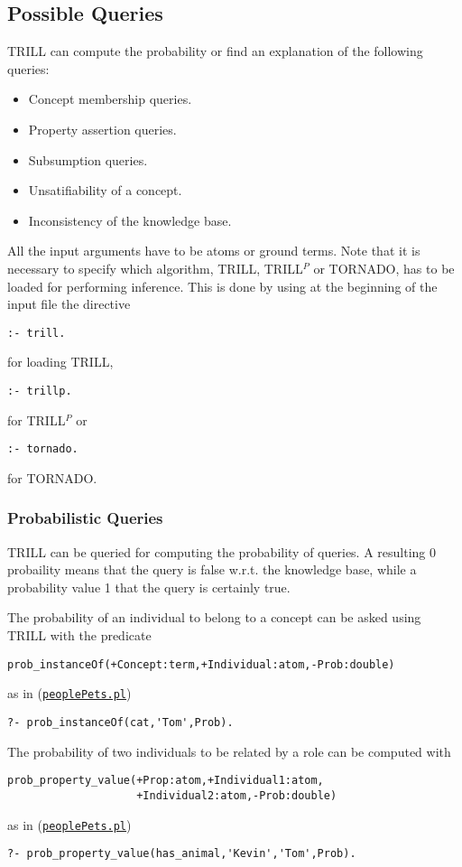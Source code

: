 \subsection{Possible Queries}
\label{queries}

TRILL can compute the probability or find an explanation of the following queries:
\begin{itemize}
  \item Concept membership queries.
  \item Property assertion queries.
  \item Subsumption queries.
  \item Unsatifiability of a concept.
  \item Inconsistency of the knowledge base.
\end{itemize}
All the input arguments have to be atoms or ground terms.
Note that it is necessary to specify which algorithm, TRILL, TRILL$^P$ or TORNADO, has to be loaded for performing inference. This is done by using at the beginning of the input file the directive
\begin{verbatim}
:- trill.
\end{verbatim}
for loading TRILL,
\begin{verbatim}
:- trillp.
\end{verbatim}
for TRILL$^P$ or
\begin{verbatim}
:- tornado.
\end{verbatim}
for TORNADO.

\subsubsection{Probabilistic Queries}
TRILL can be queried for computing the probability of queries. A resulting 0 probaility means that the query is false w.r.t. the knowledge base, while a probability value 1 that the query is certainly true.

The probability of an individual to belong to a concept can be asked using TRILL with the predicate
\begin{verbatim}
prob_instanceOf(+Concept:term,+Individual:atom,-Prob:double)
\end{verbatim}
as in (\href{http://trill.lamping.unife.it/example/trill/peoplePets.pl}{\texttt{peoplePets.pl}})
\begin{verbatim}
?- prob_instanceOf(cat,'Tom',Prob).
\end{verbatim}

The probability of two individuals to be related by a role can be computed with
\begin{verbatim}
prob_property_value(+Prop:atom,+Individual1:atom,
                    +Individual2:atom,-Prob:double)
\end{verbatim}
as in (\href{http://trill.lamping.unife.it/example/trill/peoplePets.pl}{\texttt{peoplePets.pl}})
\begin{verbatim}
?- prob_property_value(has_animal,'Kevin','Tom',Prob).
\end{verbatim}

